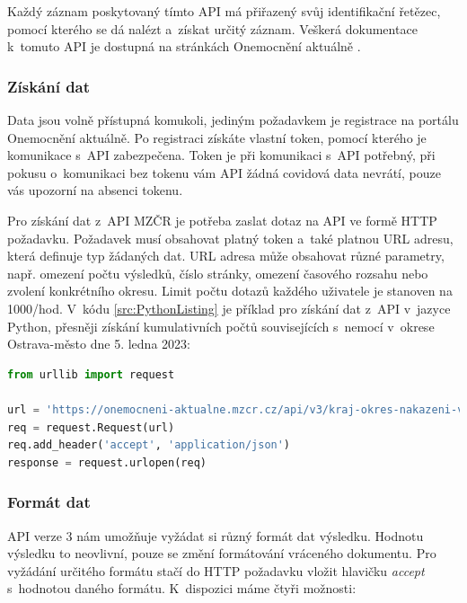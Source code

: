 Každý záznam poskytovaný tímto API má přiřazený svůj identifikační řetězec, pomocí kterého se dá nalézt a~získat určitý záznam. Veškerá dokumentace k~tomuto API je dostupná na stránkách Onemocnění aktuálně \cite{onemocneni-aktualne-docs}.

\subsubsection*{Získání dat}

Data jsou volně přístupná komukoli, jediným požadavkem je registrace na portálu Onemocnění aktuálně. Po registraci získáte vlastní token, pomocí kterého je komunikace s~API zabezpečena. Token je při komunikaci s~API potřebný, při pokusu o~komunikaci bez tokenu vám API žádná covidová data nevrátí, pouze vás upozorní na absenci tokenu.

Pro získání dat z~API MZČR je potřeba zaslat dotaz na API ve formě HTTP požadavku. Požadavek musí obsahovat platný token a~také platnou URL adresu, která definuje typ žádaných dat. URL adresa může obsahovat různé parametry, např. omezení počtu výsledků, číslo stránky, omezení časového rozsahu nebo zvolení konkrétního okresu. Limit počtu dotazů každého uživatele je stanoven na 1000/hod. V~kódu \ref{src:PythonListing} je příklad pro získání dat z~API v~jazyce Python, přesněji získání kumulativních počtů souvisejících s~nemocí v~okrese Ostrava-město dne 5. ledna 2023:


\begin{lstlisting}[language=Python,label=src:PythonListing,caption={Zaslání HTTP požadavku v~jazyce Python}]
from urllib import request

url = 'https://onemocneni-aktualne.mzcr.cz/api/v3/kraj-okres-nakazeni-vyleceni-umrti?page=1&itemsPerPage=100&datum%5Bbefore%5D=2023-01-05&datum%5Bafter%5D=2023-01-05&okres_lau_kod=CZ0806&apiToken=xyz'
req = request.Request(url)
req.add_header('accept', 'application/json')
response = request.urlopen(req)

\end{lstlisting}

\subsubsection*{Formát dat}
API verze 3 nám umožňuje vyžádat si různý formát dat výsledku. Hodnotu výsledku to neovlivní, pouze se změní formátování vráceného dokumentu. Pro vyžádání určitého formátu stačí do HTTP požadavku vložit hlavičku \emph{accept} s~hodnotou daného formátu. K~dispozici máme čtyři možnosti:

